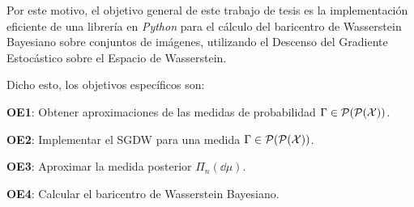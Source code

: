 Por este motivo, el objetivo general de este trabajo de tesis es la implementación eficiente de una librería en \emph{Python} para el cálculo del baricentro de Wasserstein Bayesiano sobre conjuntos de imágenes, utilizando el Descenso del Gradiente Estocástico sobre el Espacio de Wasserstein.

Dicho esto, los objetivos específicos son:
\begin{myitemize}
    \item \textbf{OE1}: Obtener aproximaciones de las medidas de probabilidad $\Gamma \in \ProbSpace[\ProbSpace[\cX]]$.
    \item \textbf{OE2}: Implementar el SGDW para una medida $\Gamma \in \ProbSpace[\ProbSpace[\cX]]$.
    \item \textbf{OE3}: Aproximar la medida posterior $\Pi_n(\dd \mu)$.
    \item \textbf{OE4}: Calcular el baricentro de Wasserstein Bayesiano.
\end{myitemize}
